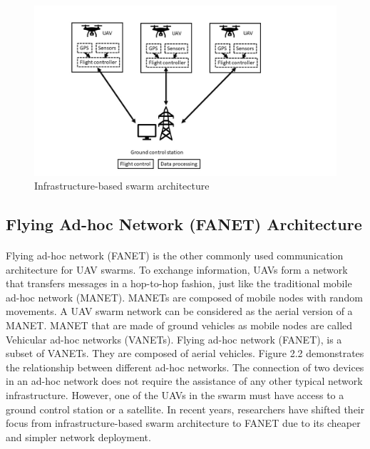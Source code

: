 \documentclass[a4paper,12pt]{report}
\begin{document}
\begin{figure}[h]
\begin{center}
\includegraphics[width=1.2\linewidth]{images/infra.jpg}
\caption{Infrastructure-based swarm architecture}
\end{center}
\end{figure}

\subsection{Flying Ad-hoc Network (FANET) Architecture}
\paragraph{}
Flying ad-hoc network (FANET) is the other commonly used communication architecture for UAV swarms. To exchange information, UAVs form a network that transfers messages in a hop-to-hop fashion, just like the traditional mobile ad-hoc network (MANET)\cite{6}. MANETs are composed of mobile nodes with random movements. A UAV swarm network can be considered as the aerial version of a MANET\cite{4}. MANET that are made of ground vehicles as mobile nodes are called Vehicular ad-hoc networks (VANETs). Flying ad-hoc network (FANET), is a subset of VANETs. They are composed of aerial vehicles. Figure 2.2 demonstrates the relationship between different ad-hoc networks. The connection of two devices in an ad-hoc network does not require the assistance of any other typical network infrastructure. However, one of the UAVs in the swarm must have access to a ground control station or a satellite\cite{doi:10.1139/juvs-2018-0009}. In recent years, researchers have shifted their focus from infrastructure-based swarm architecture to FANET due to its cheaper and simpler network deployment.  
\end{document}
